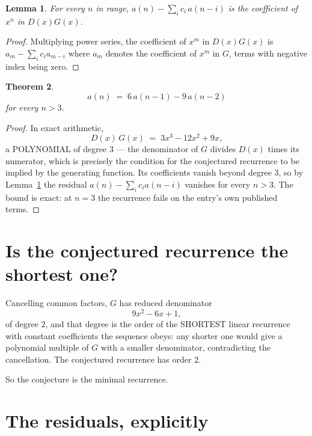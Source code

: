 \documentclass[11pt,a4paper]{article}
\theoremstyle{plain}
\newtheorem{theorem}{Theorem}
\newtheorem{lemma}[theorem]{Lemma}
\theoremstyle{definition}
\begin{document}
\begin{lemma}\label{lem:key}
For every $n$ in range, $a(n)-\sum_i c_i\,a(n-i)$ is the coefficient of $x^{n}$ in
$D(x)G(x)$.
\end{lemma}

\begin{proof}
Multiplying power series, the coefficient of $x^{m}$ in $D(x)G(x)$ is
$a_m-\sum_i c_i a_{m-i}$ where $a_m$ denotes the coefficient of $x^{m}$ in $G$, terms with
negative index being zero.
\end{proof}

\begin{theorem}
\[
a(n)\;=\;6\,a(n-1) - 9\,a(n-2)
\]
for every $n>3$.
\end{theorem}

\begin{proof}
In exact arithmetic,
\[
D(x)\,G(x)\;=\;3 x^{3} - 12 x^{2} + 9 x,
\]
a POLYNOMIAL of degree $3$ --- the denominator of $G$ divides $D(x)$ times its numerator,
which is precisely the condition for the conjectured recurrence to be implied by the
generating function. Its coefficients vanish beyond degree $3$, so by
Lemma~\ref{lem:key} the residual $a(n)-\sum_ic_ia(n-i)$ vanishes for every
$n>3$. The bound is exact: at $n=3$ the recurrence fails on the entry's own published terms.
\end{proof}

\section{Is the conjectured recurrence the shortest one?}

Cancelling common factors, $G$ has reduced denominator
\[
9 x^{2} - 6 x + 1,
\]
of degree $2$, and that degree is the order of the SHORTEST linear recurrence with
constant coefficients the sequence obeys: any shorter one would give a polynomial multiple of
$G$ with a smaller denominator, contradicting the cancellation. The conjectured recurrence has
order $2$.

So the conjecture is the minimal recurrence.

\section{The residuals, explicitly}
\end{document}
